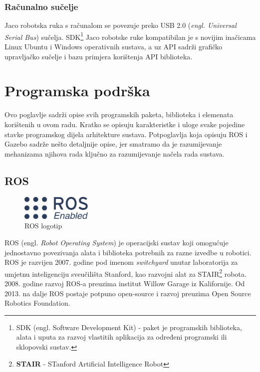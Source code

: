 \documentclass[times, utf8, diplomski, numeric]{fer}
\begin{document}

\subsection{Računalno sučelje}
Jaco robotska ruka s računalom se povezuje preko USB 2.0 (\textit{engl. Universal Serial Bus}) sučelja.
SDK\footnote{SDK (engl. Software Development Kit) - paket je programskih biblioteka, alata i uputa za razvoj vlastitih aplikacija za određeni programski ili sklopovski sustav.} Jaco robotske ruke kompatibilan je s novijim inačicama Linux Ubuntu i Windows operativnih sustava, a uz API sadrži grafičko upravljačko sučelje i bazu primjera korištenja API biblioteka.


\chapter{Programska podrška}
Ovo poglavlje sadrži opise svih programskih paketa, biblioteka i elemenata korištenih u ovom radu. 
Kratko se opisuju karakteristke i uloge svake pojedine stavke programskog dijela arhitekture sustava.
Potpoglavlja koja opisuju ROS i Gazebo sadrže nešto detaljnije opise, jer smatramo da je razumijevanje mehanizama njihova rada ključno za razumijevanje načela rada sustava.

\section{ROS}
\begin{figure}[h!]
\centering
\includegraphics[width = 0.3\textwidth]{ros_enabled}
\caption{ROS logotip}
\end{figure}
ROS (engl. \textit{Robot Operating System}) je operacijski sustav koji omogućuje jednostavno povezivanja alata i biblioteka potrebnih za razne izvedbe u robotici. 
ROS je razvijen 2007. godine pod imenom \textit{switchyard} unutar laboratorija za umjetnu inteligenciju sveučilišta Stanford, kao razvojni alat za STAIR\footnote{\textbf{STAIR} - STanford Artificial Intelligence Robot} robota.
2008. godine razvoj ROS-a preuzima institut Willow Garage iz Kalifornije. 
Od 2013. na dalje ROS postaje potpuno open-source i razvoj preuzima Open Source Robotics Foundation.
\end{document}
